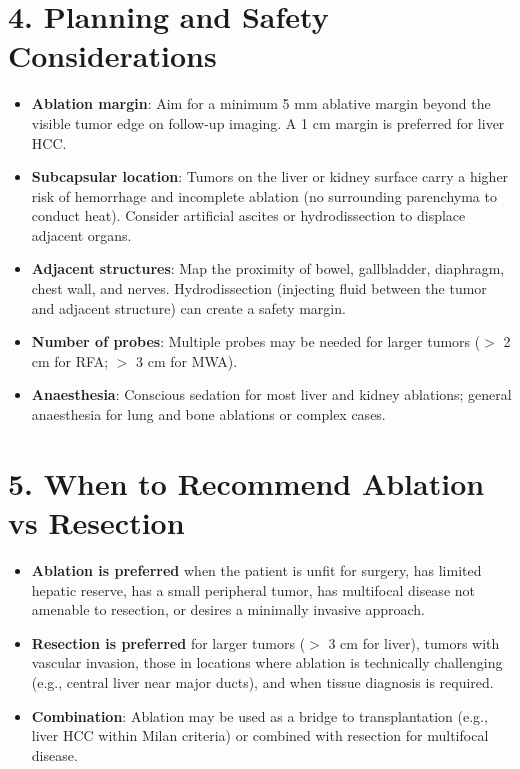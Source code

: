 \section{4. Planning and Safety Considerations}

\begin{itemize}
  \item \textbf{Ablation margin}: Aim for a minimum 5 mm ablative margin beyond the visible tumor edge on follow-up imaging. A 1 cm margin is preferred for liver HCC.
  \item \textbf{Subcapsular location}: Tumors on the liver or kidney surface carry a higher risk of hemorrhage and incomplete ablation (no surrounding parenchyma to conduct heat). Consider artificial ascites or hydrodissection to displace adjacent organs.
  \item \textbf{Adjacent structures}: Map the proximity of bowel, gallbladder, diaphragm, chest wall, and nerves. Hydrodissection (injecting fluid between the tumor and adjacent structure) can create a safety margin.
  \item \textbf{Number of probes}: Multiple probes may be needed for larger tumors ($>$ 2 cm for RFA; $>$ 3 cm for MWA).
  \item \textbf{Anaesthesia}: Conscious sedation for most liver and kidney ablations; general anaesthesia for lung and bone ablations or complex cases.
\end{itemize}

\section{5. When to Recommend Ablation vs Resection}

\begin{itemize}
  \item \textbf{Ablation is preferred} when the patient is unfit for surgery, has limited hepatic reserve, has a small peripheral tumor, has multifocal disease not amenable to resection, or desires a minimally invasive approach.
  \item \textbf{Resection is preferred} for larger tumors ($>$ 3 cm for liver), tumors with vascular invasion, those in locations where ablation is technically challenging (e.g., central liver near major ducts), and when tissue diagnosis is required.
  \item \textbf{Combination}: Ablation may be used as a bridge to transplantation (e.g., liver HCC within Milan criteria) or combined with resection for multifocal disease.
\end{itemize}


